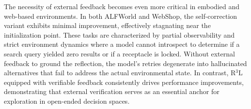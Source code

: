 \documentclass[11pt]{article}
\begin{document}
The necessity of external feedback becomes even more critical in embodied and web-based environments. In both ALFWorld and WebShop, the self-correction variant exhibits minimal improvement, effectively stagnating near the initialization point. These tasks are characterized by partial observability and strict environment dynamics where a model cannot introspect to determine if a search query yielded zero results or if a receptacle is locked. Without external feedback to ground the reflection, the model's retries degenerate into hallucinated alternatives that fail to address the actual environmental state. In contrast, R$^3$L equipped with verifiable feedback consistently drives performance improvements, demonstrating that external verification serves as an essential anchor for exploration in open-ended decision spaces.


\end{document}
